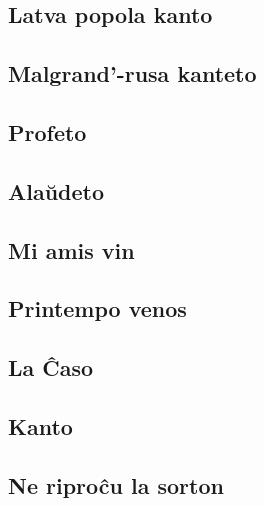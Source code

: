 \documentclass[a5paper,11pt,openany,twoside]{book}
\begin{document}
\subsection{Latva popola kanto}
\label{latva}


\subsection{Malgrand'-rusa kanteto}
\label{malgrand}

\subsection{Profeto}
\label{profeto}


\vspace*{-5ex} %

\subsection{Ala\u udeto}
\label{alauxdeto}


\vspace*{-5ex} %

\subsection{Mi amis vin}
\label{miamasvin}

\subsection{Printempo venos}
\label{printempovenos}


\subsection{La \^Caso}
\label{cxaso}


\subsection{Kanto}
\label{kanto}

\subsection{Ne ripro\^cu la sorton}
\label{riprocxu}

\end{document}
